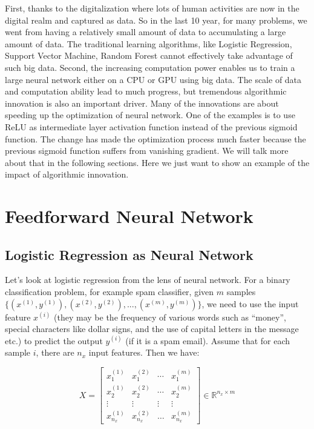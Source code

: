 \documentclass[12pt,]{krantz}
\begin{document}
First, thanks to the digitalization where lots of human activities are now in the digital realm and captured as data. So in the last 10 year, for many problems, we went from having a relatively small amount of data to accumulating a large amount of data. The traditional learning algorithms, like Logistic Regression, Support Vector Machine, Random Forest cannot effectively take advantage of such big data. Second, the increasing computation power enables us to train a large neural network either on a CPU or GPU using big data. The scale of data and computation ability lead to much progress, but tremendous algorithmic innovation is also an important driver. Many of the innovations are about speeding up the optimization of neural network. One of the examples is to use ReLU as intermediate layer activation function instead of the previous sigmoid function. The change has made the optimization process much faster because the previous sigmoid function suffers from vanishing gradient. We will talk more about that in the following sections. Here we just want to show an example of the impact of algorithmic innovation.

\hypertarget{feedforward-neural-network}{%
\section{Feedforward Neural Network}\label{feedforward-neural-network}}

\hypertarget{logistic_reg_as_neural_network}{%
\subsection{Logistic Regression as Neural Network}\label{logistic_reg_as_neural_network}}

Let's look at logistic regression from the lens of neural network. For a binary classification problem, for example spam classifier, given \(m\) samples \(\{(x^{(1)}, y^{(1)}),(x^{(2)}, y^{(2)}),...,(x^{(m)}, y^{(m)})\}\), we need to use the input feature \(x^{(i)}\) (they may be the frequency of various words such as ``money'', special characters like dollar signs, and the use of capital letters in the message etc.) to predict the output \(y^{(i)}\) (if it is a spam email). Assume that for each sample \(i\), there are \(n_{x}\) input features. Then we have:

\begin{equation}
X=\left[\begin{array}{cccc}
x_{1}^{(1)} & x_{1}^{(2)} & \dotsb & x_{1}^{(m)}\\
x_{2}^{(1)} & x_{2}^{(2)} & \dotsb & x_{2}^{(m)}\\
\vdots & \vdots & \vdots & \vdots\\
x_{n_{x}}^{(1)} & x_{n_{x}}^{(2)} & \dots & x_{n_{x}}^{(m)}
\end{array}\right]\in\mathbb{R}^{n_{x}\times m}
\label{eq:input}
\end{equation}
\end{document}
